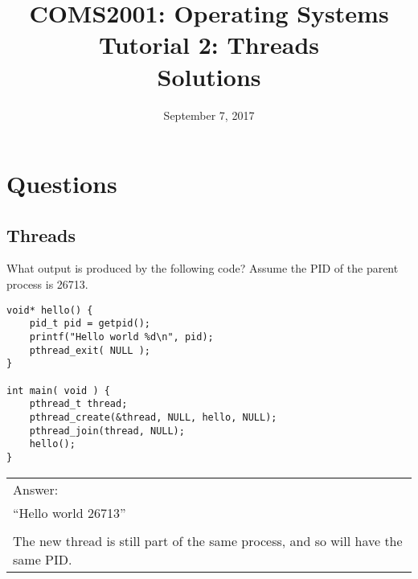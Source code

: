 \documentclass[11pt,a4paper]{article}
\newenvironment{answer}
   {\begin{center}
    \begin{tabular}{|p{0.95\textwidth}|}
    \hline
    }
    { 
    \\\hline
    \end{tabular} 
    \end{center}
    }
\begin{document}
\title{COMS2001: Operating Systems\\Tutorial 2: Threads\\Solutions}
\date{September 7, 2017}
\maketitle

\tableofcontents
\pagebreak

\section{Questions}
\subsection{Threads}
What output is produced by the following code? Assume the PID of the parent process is 26713.
\begin{shaded}
\begin{lstlisting}
void* hello() {
	pid_t pid = getpid();
	printf("Hello world %d\n", pid);
	pthread_exit( NULL );
}

int main( void ) {
	pthread_t thread;
	pthread_create(&thread, NULL, hello, NULL);
	pthread_join(thread, NULL);
	hello();
}
\end{lstlisting}
\end{shaded}
\begin{answer}
\color{red}Answer:\\
``Hello world 26713''\\\\
The new thread is still part of the same process, and so will have the same PID.
\end{answer}
\pagebreak
\end{document}
